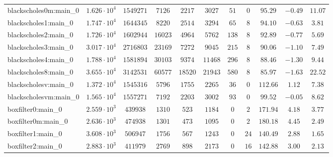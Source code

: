 \begin{tabular}{|l|c|c|c|c|c|c|c|c|c|c|}
blackscholes0m:main\_0         & $ 1.626 \cdot 10^{4} $ & $ 1549271  $ & $ 7126   $ & $ 2217   $ & $ 3027   $ & $ 51   $ & $ 0    $ & $ 95.29       $ & $ -0.49   $ & $ 11.07   $ \\
blackscholes1:main\_0          & $ 1.747 \cdot 10^{4} $ & $ 1644345  $ & $ 8220   $ & $ 2514   $ & $ 3294   $ & $ 65   $ & $ 8    $ & $ 94.10       $ & $ -0.63   $ & $ 3.81    $ \\
blackscholes2:main\_0          & $ 1.726 \cdot 10^{4} $ & $ 1602944  $ & $ 16023  $ & $ 4964   $ & $ 5762   $ & $ 138  $ & $ 8    $ & $ 92.89       $ & $ -0.77   $ & $ 5.69    $ \\
blackscholes3:main\_0          & $ 3.017 \cdot 10^{4} $ & $ 2716803  $ & $ 23169  $ & $ 7272   $ & $ 9045   $ & $ 215  $ & $ 8    $ & $ 90.06       $ & $ -1.10   $ & $ 7.49    $ \\
blackscholes4:main\_0          & $ 1.788 \cdot 10^{4} $ & $ 1581894  $ & $ 30103  $ & $ 9374   $ & $ 11468  $ & $ 296  $ & $ 8    $ & $ 88.46       $ & $ -1.30   $ & $ 9.44    $ \\
blackscholes8:main\_0          & $ 3.655 \cdot 10^{4} $ & $ 3142531  $ & $ 60577  $ & $ 18520  $ & $ 21943  $ & $ 580  $ & $ 8    $ & $ 85.97       $ & $ -1.63   $ & $ 22.52   $ \\
blackscholesv:main\_0          & $ 1.372 \cdot 10^{4} $ & $ 1545316  $ & $ 5796   $ & $ 1755   $ & $ 2265   $ & $ 36   $ & $ 0    $ & $ 112.66      $ & $ 1.12    $ & $ 7.38    $ \\
blackscholesvm:main\_0         & $ 1.565 \cdot 10^{4} $ & $ 1557271  $ & $ 7192   $ & $ 2203   $ & $ 3002   $ & $ 93   $ & $ 0    $ & $ 99.52       $ & $ -0.05   $ & $ 8.62    $ \\
boxfilter0:main\_0             & $ 2.559 \cdot 10^{3} $ & $ 439938   $ & $ 1310   $ & $ 523    $ & $ 1184   $ & $ 0    $ & $ 2    $ & $ 171.94      $ & $ 4.18    $ & $ 3.77    $ \\
boxfilter0m:main\_0            & $ 2.636 \cdot 10^{3} $ & $ 474938   $ & $ 1301   $ & $ 473    $ & $ 1095   $ & $ 0    $ & $ 2    $ & $ 180.18      $ & $ 4.45    $ & $ 2.49    $ \\
boxfilter1:main\_0             & $ 3.608 \cdot 10^{3} $ & $ 506947   $ & $ 1756   $ & $ 567    $ & $ 1243   $ & $ 0    $ & $ 24   $ & $ 140.49      $ & $ 2.88    $ & $ 1.65    $ \\
boxfilter2:main\_0             & $ 2.883 \cdot 10^{3} $ & $ 411979   $ & $ 2769   $ & $ 898    $ & $ 2173   $ & $ 0    $ & $ 16   $ & $ 142.88      $ & $ 3.00    $ & $ 2.13    $ \\

\end{tabular}
